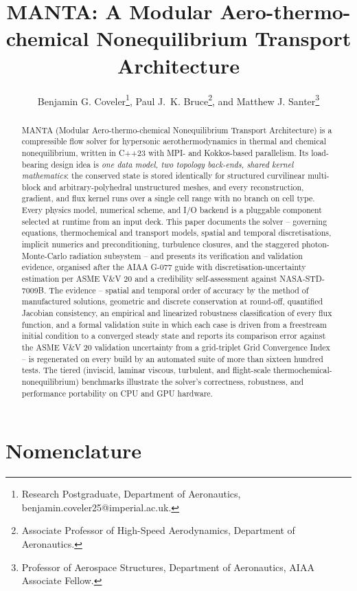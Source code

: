\documentclass[journal,biblatex]{new-aiaa}
\title{MANTA: A Modular Aero-thermo-chemical Nonequilibrium Transport Architecture}
\author{Benjamin G. Coveler\footnote{Research Postgraduate, Department of Aeronautics, benjamin.coveler25@imperial.ac.uk.}, Paul J.~K. Bruce\footnote{Associate Professor of High-Speed Aerodynamics, Department of Aeronautics.}, and Matthew J. Santer\footnote{Professor of Aerospace Structures, Department of Aeronautics, AIAA Associate Fellow.}}
\affil{Imperial College London, London, SW7 2AZ, United Kingdom}
\begin{document}
\maketitle


\begin{abstract}
\noindent MANTA (Modular Aero-thermo-chemical Nonequilibrium Transport Architecture) is a compressible flow solver for hypersonic aerothermodynamics in thermal and chemical nonequilibrium, written in C++23 with MPI- and Kokkos-based parallelism. Its load-bearing design idea is \emph{one data model, two topology back-ends, shared kernel mathematics}: the conserved state is stored identically for structured curvilinear multi-block and arbitrary-polyhedral unstructured meshes, and every reconstruction, gradient, and flux kernel runs over a single cell range with no branch on cell type. Every physics model, numerical scheme, and I/O backend is a pluggable component selected at runtime from an input deck. This paper documents the solver -- governing equations, thermochemical and transport models, spatial and temporal discretisations, implicit numerics and preconditioning, turbulence closures, and the staggered photon-Monte-Carlo radiation subsystem -- and presents its verification and validation evidence, organised after the AIAA G-077 guide with discretisation-uncertainty estimation per ASME V\&V 20 and a credibility self-assessment against NASA-STD-7009B. The evidence -- spatial and temporal order of accuracy by the method of manufactured solutions, geometric and discrete conservation at round-off, quantified Jacobian consistency, an empirical and linearized robustness classification of every flux function, and a formal validation suite in which each case is driven from a freestream initial condition to a converged steady state and reports its comparison error against the ASME V\&V 20 validation uncertainty from a grid-triplet Grid Convergence Index -- is regenerated on every build by an automated suite of more than sixteen hundred tests. The tiered (inviscid, laminar viscous, turbulent, and flight-scale thermochemical-nonequilibrium) benchmarks illustrate the solver's correctness, robustness, and performance portability on CPU and GPU hardware.
\end{abstract}

\newpage

\section*{Nomenclature}
\end{document}
